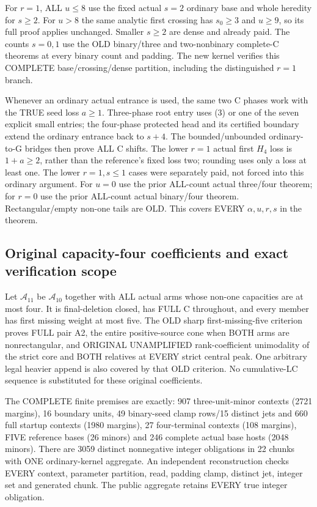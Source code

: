 For $r=1$, ALL $u\le8$ use the fixed actual $s=2$ ordinary
base and whole heredity for $s\ge2$. For $u>8$ the same analytic
first crossing has $s_0\ge3$ and $u\ge9$, so its full proof
applies unchanged. Smaller $s\ge2$ are dense and already paid.
The counts $s=0,1$ use the OLD binary/three and two-nonbinary
complete-C theorems at every binary count and padding.
The new kernel verifies this COMPLETE base/crossing/dense
partition, including the distinguished $r=1$ branch.

Whenever an ordinary actual entrance is used, the same two C
phases work with the TRUE seed loss $a\ge1$. Three-phase root
entry uses (3) or one of the seven explicit small entries; the
four-phase protected head and its certified boundary extend the
ordinary entrance back to $s+4$. The bounded/unbounded
ordinary-to-G bridges then prove ALL C shifts. The lower
$r=1$ actual first $H_4$ loss is $1+a\ge2$, rather than the
reference's fixed loss two; rounding uses only a loss at least one.
The lower
$r=1,s\le1$ cases were separately paid, not forced into this
ordinary argument. For $u=0$ use the prior ALL-count actual
three/four theorem; for $r=0$ use the prior ALL-count actual
binary/four theorem. Rectangular/empty non-one tails are OLD.
This covers EVERY $\alpha,u,r,s$ in the theorem.

\subsection{Original capacity-four coefficients and exact verification scope}
Let $\mathcal A_{11}$ be $\mathcal A_{10}$ together with ALL
actual arms whose non-one capacities are at most four.
It is final-deletion closed, has FULL C throughout, and every
member has first missing weight at most five. The OLD sharp
first-missing-five criterion proves FULL pair A2, the entire
positive-source cone when BOTH arms are nonrectangular, and
ORIGINAL UNAMPLIFIED rank-coefficient unimodality of the strict
core and BOTH relatives at EVERY strict central peak. One
arbitrary legal heavier append is also covered by that OLD criterion.
No cumulative-LC sequence is substituted for these original coefficients.

The COMPLETE finite premises are exactly: 907 three-unit-minor
contexts (2721 margins), 16 boundary units, 49 binary-seed clamp
rows/15 distinct jets and 660 full startup contexts (1980 margins),
27 four-terminal contexts (108 margins), FIVE reference bases
(26 minors) and 246 complete actual base hosts (2048 minors).
There are 3059 distinct nonnegative integer obligations in 22
chunks with ONE ordinary-kernel aggregate. An independent
reconstruction checks EVERY context, parameter partition, read,
padding clamp, distinct jet, integer set and generated chunk.
The public aggregate retains EVERY true integer obligation.

